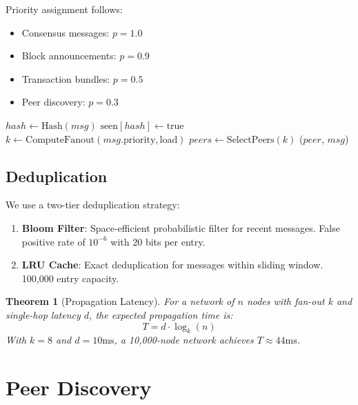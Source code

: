 \documentclass[11pt,a4paper]{article}
\newtheorem{theorem}{Theorem}
\begin{document}
Priority assignment follows:
\begin{itemize}
    \item Consensus messages: $p = 1.0$
    \item Block announcements: $p = 0.9$
    \item Transaction bundles: $p = 0.5$
    \item Peer discovery: $p = 0.3$
\end{itemize}

\begin{algorithm}
\caption{Adaptive Gossip Propagation}
\begin{algorithmic}[1]
    \State $hash \gets \text{Hash}(msg)$
        \Return {}
    \EndIf
    \State $\text{seen}[hash] \gets \text{true}$
    \State $k \gets \text{ComputeFanout}(msg.\text{priority}, \text{load})$
    \State $peers \gets \text{SelectPeers}(k)$
            \State {}($peer$, $msg$)
        \EndIf
    \EndFor
\EndProcedure
\end{algorithmic}
\end{algorithm}

\subsection{Deduplication}

We use a two-tier deduplication strategy:

\begin{enumerate}
    \item \textbf{Bloom Filter}: Space-efficient probabilistic filter for recent messages. False positive rate of $10^{-6}$ with 20 bits per entry.
    \item \textbf{LRU Cache}: Exact deduplication for messages within sliding window. 100,000 entry capacity.
\end{enumerate}

\begin{theorem}[Propagation Latency]
For a network of $n$ nodes with fan-out $k$ and single-hop latency $d$, the expected propagation time is:
\[
T = d \cdot \log_k(n)
\]
With $k = 8$ and $d = 10\text{ms}$, a 10,000-node network achieves $T \approx 44\text{ms}$.
\end{theorem}

\section{Peer Discovery}
\end{document}
